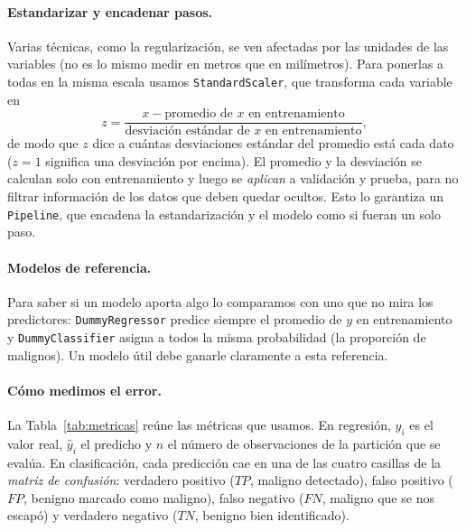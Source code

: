 \paragraph{Estandarizar y encadenar pasos.}
Varias técnicas, como la regularización, se ven afectadas por las unidades
de las variables (no es lo mismo medir en metros que en milímetros). Para
ponerlas a todas en la misma escala usamos \texttt{StandardScaler}, que
transforma cada variable en
\[
    z = \frac{x - \text{promedio de } x \text{ en entrenamiento}}
             {\text{desviación estándar de } x \text{ en entrenamiento}},
\]
de modo que $z$ dice a cuántas desviaciones estándar del promedio está cada
dato ($z=1$ significa una desviación por encima). El promedio y la
desviación se calculan solo con entrenamiento y luego se \emph{aplican} a
validación y prueba, para no filtrar información de los datos que deben
quedar ocultos. Esto lo garantiza un \texttt{Pipeline}, que encadena la
estandarización y el modelo como si fueran un solo paso.

\paragraph{Modelos de referencia.}
Para saber si un modelo aporta algo lo comparamos con uno que no mira los
predictores: \texttt{DummyRegressor} predice siempre el promedio de $y$ en
entrenamiento y \texttt{DummyClassifier} asigna a todos la misma
probabilidad (la proporción de malignos). Un modelo útil debe ganarle
claramente a esta referencia.

\paragraph{Cómo medimos el error.}
La Tabla~\ref{tab:metricas} reúne las métricas que usamos. En regresión,
$y_i$ es el valor real, $\hat y_i$ el predicho y $n$ el número de
observaciones de la partición que se evalúa. En clasificación, cada
predicción cae en una de las cuatro casillas de la \emph{matriz de
confusión}: verdadero positivo ($TP$, maligno detectado), falso positivo
($FP$, benigno marcado como maligno), falso negativo ($FN$, maligno que se
nos escapó) y verdadero negativo ($TN$, benigno bien identificado).

